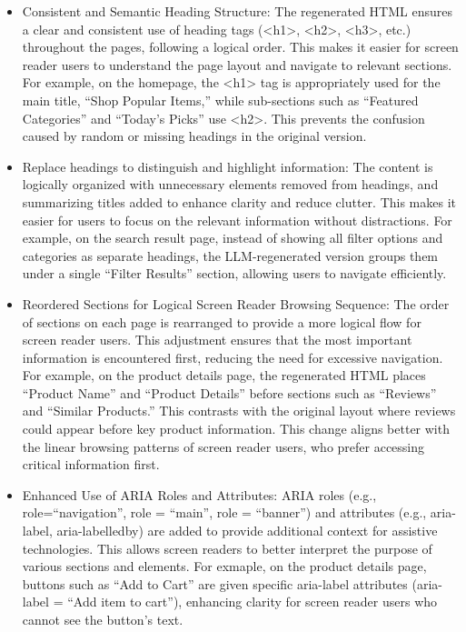 \begin{itemize}
    \item Consistent and Semantic Heading Structure: The regenerated HTML ensures a clear and consistent use of heading tags (<h1>, <h2>, <h3>, etc.) throughout the pages, following a logical order. This makes it easier for screen reader users to understand the page layout and navigate to relevant sections. For example, on the homepage, the <h1> tag is appropriately used for the main title, ``Shop Popular Items,'' while sub-sections such as ``Featured Categories'' and ``Today's Picks'' use <h2>. This prevents the confusion caused by random or missing headings in the original version.
    \item Replace headings to distinguish and highlight information: The content is logically organized with unnecessary elements removed from headings, and summarizing titles added to enhance clarity and reduce clutter. This makes it easier for users to focus on the relevant information without distractions. For example, on the search result page, instead of showing all filter options and categories as separate headings, the LLM-regenerated version groups them under a single ``Filter Results'' section, allowing users to navigate efficiently.
    \item Reordered Sections for Logical Screen Reader Browsing Sequence: The order of sections on each page is rearranged to provide a more logical flow for screen reader users. This adjustment ensures that the most important information is encountered first, reducing the need for excessive navigation. For example, on the product details page, the regenerated HTML places ``Product Name'' and ``Product Details'' before sections such as ``Reviews'' and ``Similar Products.'' This contrasts with the original layout where reviews could appear before key product information. This change aligns better with the linear browsing patterns of screen reader users, who prefer accessing critical information first.
    \item Enhanced Use of ARIA Roles and Attributes: ARIA roles (e.g., role=``navigation'', role = ``main'', role = ``banner'') and attributes (e.g., aria-label, aria-labelledby) are added to provide additional context for assistive technologies. This allows screen readers to better interpret the purpose of various sections and elements. For exmaple, on the product details page, buttons such as ``Add to Cart'' are given specific aria-label attributes (aria-label = ``Add item to cart''), enhancing clarity for screen reader users who cannot see the button's text.
\end{itemize}

